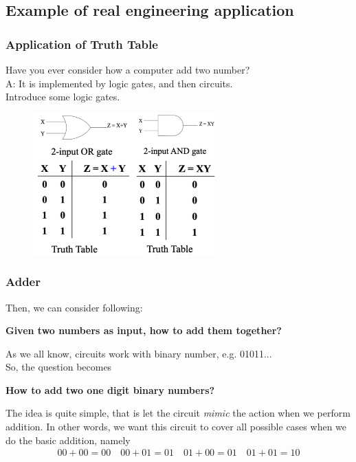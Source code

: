 \documentclass[12pt, t]{beamer}
\renewcommand{\emph}[1]{{\color{Turquoise3}\textsl{#1}}}
\begin{document}
\subsection{Example of real engineering application}
\begin{frame}
    \frametitle{Application of Truth Table}
    Have you ever consider how a computer add two number?\\
    A: It is implemented by logic gates, and then circuits.\\
    Introduce some logic gates.
    \begin{figure}
        \centering
        \includegraphics[width=7cm]{Figures/Logic.png}
    \end{figure}
\end{frame}


\begin{frame}
    \frametitle{Adder}
    Then, we can consider following:\\
    \begin{center}
        \textbf{Given two numbers as input, how to add them together?}\\
    \end{center}

    As we all know, circuits work with binary number, e.g. 01011...\\
    So, the question becomes
    \begin{center}
        \textbf{How to add two one digit binary numbers?}\\
    \end{center}

    The idea is quite simple, that is let the circuit \emph{mimic} the action when we perform addition.
    In other words, we want this circuit to cover all possible cases when we do the basic addition, namely\\
    \begin{align*}
        00+00=00 \quad 00+01=01 \quad 01+00=01 \quad 01+01=10
    \end{align*}
\end{frame}
\end{document}
